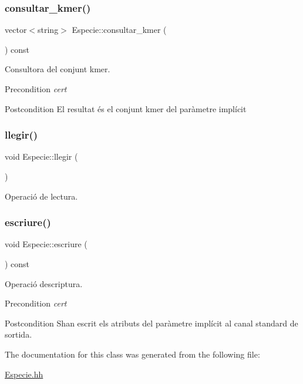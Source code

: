 \subsubsection{\texorpdfstring{consultar\+\_\+kmer()}{consultar\_kmer()}}
{\footnotesize\ttfamily vector$<$string$>$ Especie\+::consultar\+\_\+kmer (\begin{DoxyParamCaption}{ }\end{DoxyParamCaption}) const}



Consultora del conjunt kmer. 

\begin{DoxyPrecond}{Precondition}
{\itshape cert} 
\end{DoxyPrecond}
\begin{DoxyPostcond}{Postcondition}
El resultat és el conjunt kmer del paràmetre implícit 
\end{DoxyPostcond}
\mbox{\label{class_especie_a7384add391d2684c4fb6bdf8a535fba3}} 
\subsubsection{\texorpdfstring{llegir()}{llegir()}}
{\footnotesize\ttfamily void Especie\+::llegir (\begin{DoxyParamCaption}{ }\end{DoxyParamCaption})}



Operació de lectura. 

\mbox{\label{class_especie_ae24802ae0746b2560a48eea40f64760e}} 
\subsubsection{\texorpdfstring{escriure()}{escriure()}}
{\footnotesize\ttfamily void Especie\+::escriure (\begin{DoxyParamCaption}{ }\end{DoxyParamCaption}) const}



Operació d\textquotesingle{}escriptura. 

\begin{DoxyPrecond}{Precondition}
{\itshape cert} 
\end{DoxyPrecond}
\begin{DoxyPostcond}{Postcondition}
S\textquotesingle{}han escrit els atributs del paràmetre implícit al canal standard de sortida. 
\end{DoxyPostcond}


The documentation for this class was generated from the following file\+:\begin{DoxyCompactItemize}
\item 
\hyperlink{_especie_8hh}{Especie.\+hh}\end{DoxyCompactItemize}
